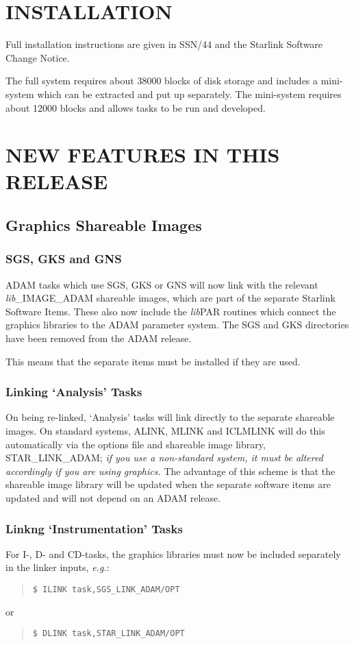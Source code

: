 \section{INSTALLATION}
Full installation instructions are given in SSN/44 and the Starlink Software 
Change Notice.

The full system requires about 38000 blocks of disk storage and includes a
mini-system which can be extracted and put up separately. The mini-system
requires about 12000 blocks and allows tasks to be run and  developed.

\section{NEW FEATURES IN THIS RELEASE}

\subsection{Graphics Shareable Images}
\subsubsection{SGS, GKS and GNS}
\label{graphs}
ADAM tasks which use SGS, GKS or GNS will now link with the relevant
{\em lib}\_IMAGE\_ADAM shareable images, which are part of the separate
Starlink Software Items. These also now include the {\em lib}PAR routines
which connect the graphics libraries to the ADAM parameter system.
The SGS and GKS directories have been removed from the ADAM release.

This means that the separate items must be installed if they are used.


\subsubsection{Linking `Analysis' Tasks}
On being re-linked, `Analysis' tasks will link directly to the separate 
shareable images.
On standard systems, ALINK, MLINK and ICLMLINK will do this automatically via
the options file and shareable image library, STAR\_LINK\_ADAM;
{\em if you use a non-standard system, it must be altered accordingly if you 
are using graphics.} The advantage of this scheme is that the shareable image
library will be updated when the separate software items are updated and will
not depend on an ADAM release.

\subsubsection{Linkng `Instrumentation' Tasks}
For I-, D- and CD-tasks, the graphics libraries must now be
included separately in the linker inputs, {\em e.g.}:
\begin{quote} \begin{verbatim}
$ ILINK task,SGS_LINK_ADAM/OPT
\end{verbatim} \end{quote}
or
\begin{quote} \begin{verbatim}
$ DLINK task,STAR_LINK_ADAM/OPT
\end{verbatim} \end{quote}

